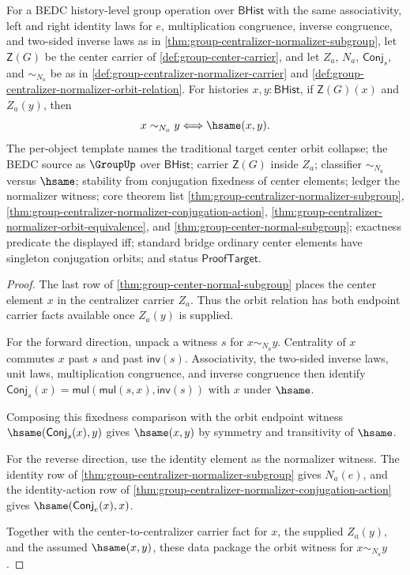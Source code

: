 \begin{theorem}
\label{thm:group-center-normalizer-orbit-collapse}
For a BEDC history-level group operation over $\mathsf{BHist}$ with the same
associativity, left and right identity laws for $e$, multiplication
congruence, inverse congruence, and two-sided inverse laws as in
\autoref{thm:group-centralizer-normalizer-subgroup}, let $\mathsf{Z}(G)$ be
the center carrier of \autoref{def:group-center-carrier}, and let $Z_a$,
$N_a$, $\mathsf{Conj}_s$, and $\sim_{N_a}$ be as in
\autoref{def:group-centralizer-normalizer-carrier} and
\autoref{def:group-centralizer-normalizer-orbit-relation}. For histories
$x,y:\mathsf{BHist}$, if $\mathsf{Z}(G)(x)$ and $Z_a(y)$, then
$$
x\sim_{N_a}y \Longleftrightarrow \hsame(x,y).
$$
The per-object template names the traditional target center orbit collapse;
the BEDC source as $\GroupUp$ over $\mathsf{BHist}$; carrier
$\mathsf{Z}(G)$ inside $Z_a$; classifier $\sim_{N_a}$ versus $\hsame$;
stability from conjugation fixedness of center elements; ledger the normalizer
witness; core theorem list
\autoref{thm:group-centralizer-normalizer-subgroup},
\autoref{thm:group-centralizer-normalizer-conjugation-action},
\autoref{thm:group-centralizer-normalizer-orbit-equivalence}, and
\autoref{thm:group-center-normal-subgroup}; exactness predicate the displayed
iff; standard bridge ordinary center elements have singleton conjugation
orbits; and status $\mathsf{ProofTarget}$.
\end{theorem}
\begin{proof}
The last row of \autoref{thm:group-center-normal-subgroup} places the center
element $x$ in the centralizer carrier $Z_a$. Thus the orbit relation has both
endpoint carrier facts available once $Z_a(y)$ is supplied.

For the forward direction, unpack a witness $s$ for $x\sim_{N_a}y$. Centrality
of $x$ commutes $x$ past $s$ and past $\mathsf{inv}(s)$. Associativity, the
two-sided inverse laws, unit laws, multiplication congruence, and inverse
congruence then identify
$\mathsf{Conj}_s(x)=\mathsf{mul}(\mathsf{mul}(s,x),\mathsf{inv}(s))$ with
$x$ under $\hsame$.

Composing this fixedness comparison with the orbit endpoint witness
$\hsame(\mathsf{Conj}_s(x),y)$ gives $\hsame(x,y)$ by symmetry and
transitivity of $\hsame$.

For the reverse direction, use the identity element as the normalizer witness.
The identity row of \autoref{thm:group-centralizer-normalizer-subgroup} gives
$N_a(e)$, and the identity-action row of
\autoref{thm:group-centralizer-normalizer-conjugation-action} gives
$\hsame(\mathsf{Conj}_e(x),x)$.

Together with the center-to-centralizer carrier fact for $x$, the supplied
$Z_a(y)$, and the assumed $\hsame(x,y)$, these data package the orbit witness
for $x\sim_{N_a}y$.
\end{proof}

